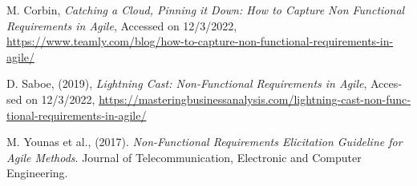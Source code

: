 {\begin{latin}
\begin{thebibliography}{9}
	M. Corbin,
	\textit{Catching a Cloud, Pinning it Down: How to Capture Non Functional Requirements in Agile},
	Accessed on 12/3/2022,
	\url{https://www.teamly.com/blog/how-to-capture-non-functional-requirements-in-agile/}
	
	 D. Saboe, (2019),
	 \textit{Lightning Cast: Non-Functional Requirements in Agile},
	 Accessed on 12/3/2022,
	 \url{https://masteringbusinessanalysis.com/lightning-cast-non-functional-requirements-in-agile/}
	 
	 	  

	M. Younas et al., (2017).
	\textit{Non-Functional Requirements Elicitation Guideline for Agile Methods}. Journal of Telecommunication, Electronic and Computer Engineering.
	 

	  

	  
	  
	 
	 
	
	
\end{thebibliography}
\endgroup
\end{latin}

}
